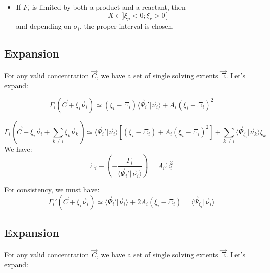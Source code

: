 \documentclass[aps,12pt]{revtex4}
\begin{document}
\begin{itemize}
\begin{itemize}
	\item If $F_i$ is limited by both a product and a reactant, then $$X\in\rbrack \xi_p < 0 ; \xi_r > 0 \lbrack$$
	and depending on $\sigma_i$, the proper interval is chosen.
	\end{itemize}
	
\end{itemize}

\subsection{Expansion}

For any valid concentration $\vec{C}$, we have a set of single solving extents $\vec{\Xi}$.
Let's expand:

\begin{equation}
\Gamma_i(\vec{C} + \xi_i \vec{\nu}_i) \simeq (\xi_i - \Xi_i) \langle \vec{\Psi}_i' \vert \vec{\nu}_i \rangle + A_i (\xi_i - \Xi_i)^2
\end{equation}

\begin{equation}
\Gamma_i(\vec{C} + \xi_i \vec{\nu}_i + \sum_{k\not=i} \xi_k \vec{\nu}_k) \simeq 
\langle \vec{\Psi}_i' \vert \vec{\nu}_i \rangle \left[ (\xi_i - \Xi_i)  + A_i (\xi_i - \Xi_i)^2 \right] + 
\sum_{k\not=i} \langle \vec{\Psi}_{\xi_i} \vert \vec{\nu}_k \rangle \xi_k
\end{equation}
We have:
\begin{equation}
	\Xi_i - \left( - \dfrac{\Gamma_i}{\langle \vec{\Psi}_i' \vert \vec{\nu}_i \rangle}\right) =  A_i \Xi_i^2
\end{equation}

For consistency, we must have:
\begin{equation}
 \Gamma_i'(\vec{C}+\xi_i \vec{\nu}_i) \simeq \langle \vec{\Psi}_i' \vert \vec{\nu}_i \rangle + 2 A_i \left(\xi_i - \Xi_i\right) = 
 \langle \vec{\Psi}_{\xi_i} \vert \vec{\nu}_i \rangle
\end{equation}

\subsection{Expansion}

For any valid concentration $\vec{C}$, we have a set of single solving extents $\vec{\Xi}$.
Let's expand:
\end{document}
